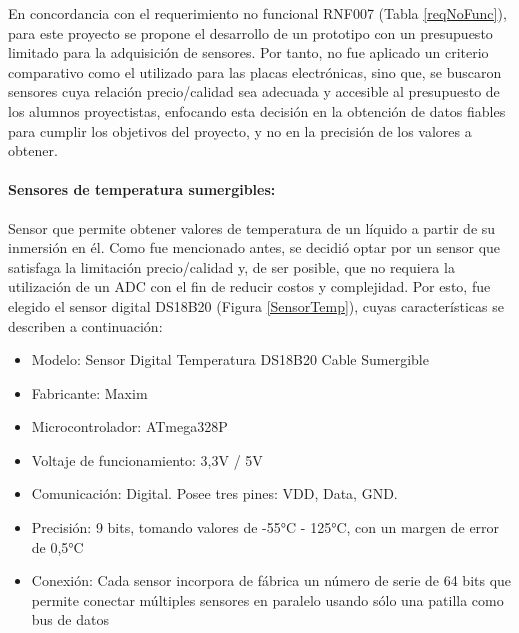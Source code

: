             \par En concordancia con el requerimiento no funcional RNF007 (Tabla \ref{reqNoFunc}), para este proyecto se propone el desarrollo de un prototipo con un presupuesto limitado para la adquisición de sensores. Por tanto, no fue aplicado un criterio comparativo como el utilizado para las placas electrónicas, sino que, se buscaron sensores cuya relación precio/calidad sea adecuada y accesible al presupuesto de los alumnos proyectistas, enfocando esta decisión en la obtención de datos fiables para cumplir los objetivos del proyecto, y no en la precisión de los valores a obtener.
            
            \paragraph{Sensores de temperatura sumergibles:}Sensor que permite obtener valores de temperatura de un líquido a partir de su inmersión en él. Como fue mencionado antes, se decidió optar por un sensor que satisfaga la limitación precio/calidad y, de ser posible, que no requiera la utilización de un ADC con el fin de reducir costos y complejidad. Por esto, fue elegido el sensor digital DS18B20 (Figura \ref{SensorTemp}), cuyas características se describen a continuación:
            
                \begin{itemize}
                    \item Modelo: Sensor Digital Temperatura DS18B20 Cable Sumergible
                    \item Fabricante: Maxim
                    \item Microcontrolador: ATmega328P
                    \item Voltaje de funcionamiento: 3,3V / 5V
                    \item Comunicación: Digital. Posee tres pines: VDD, Data, GND.
                    \item Precisión: 9 bits, tomando valores de -55°C - 125°C, con un margen de error de 0,5°C
                    \item Conexión: Cada sensor incorpora de fábrica un número de serie de 64 bits que permite conectar múltiples sensores en paralelo usando sólo una patilla como bus de datos
                \end{itemize}
                
